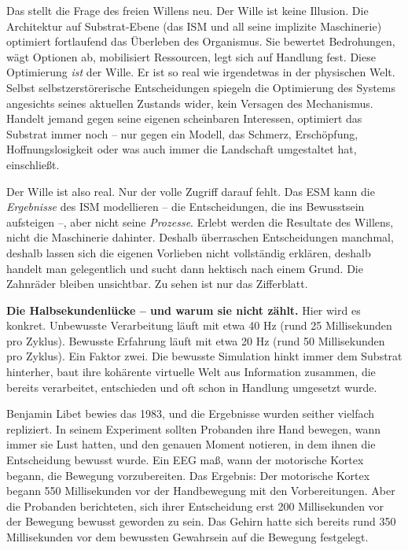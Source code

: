 \documentclass[11pt, twoside, openright]{book}
\begin{document}
Das stellt die Frage des freien Willens neu. Der Wille ist keine Illusion. Die Architektur auf Substrat-Ebene (das ISM und all seine implizite Maschinerie) optimiert fortlaufend das Überleben des Organismus. Sie bewertet Bedrohungen, wägt Optionen ab, mobilisiert Ressourcen, legt sich auf Handlung fest. Diese Optimierung \textit{ist} der Wille. Er ist so real wie irgendetwas in der physischen Welt. Selbst selbstzerstörerische Entscheidungen spiegeln die Optimierung des Systems angesichts seines aktuellen Zustands wider, kein Versagen des Mechanismus. Handelt jemand gegen seine eigenen scheinbaren Interessen, optimiert das Substrat immer noch -- nur gegen ein Modell, das Schmerz, Erschöpfung, Hoffnungslosigkeit oder was auch immer die Landschaft umgestaltet hat, einschließt.

Der Wille ist also real. Nur der volle Zugriff darauf fehlt. Das ESM kann die \textit{Ergebnisse} des ISM modellieren -- die Entscheidungen, die ins Bewusstsein aufsteigen --, aber nicht seine \textit{Prozesse}. Erlebt werden die Resultate des Willens, nicht die Maschinerie dahinter. Deshalb überraschen Entscheidungen manchmal, deshalb lassen sich die eigenen Vorlieben nicht vollständig erklären, deshalb handelt man gelegentlich und sucht dann hektisch nach einem Grund. Die Zahnräder bleiben unsichtbar. Zu sehen ist nur das Zifferblatt.

\textbf{Die Halbsekundenlücke -- und warum sie nicht zählt.} Hier wird es konkret. Unbewusste Verarbeitung läuft mit etwa 40 Hz (rund 25 Millisekunden pro Zyklus). Bewusste Erfahrung läuft mit etwa 20 Hz (rund 50 Millisekunden pro Zyklus). Ein Faktor zwei. Die bewusste Simulation hinkt immer dem Substrat hinterher, baut ihre kohärente virtuelle Welt aus Information zusammen, die bereits verarbeitet, entschieden und oft schon in Handlung umgesetzt wurde.

Benjamin Libet bewies das 1983, und die Ergebnisse wurden seither vielfach repliziert. In seinem Experiment sollten Probanden ihre Hand bewegen, wann immer sie Lust hatten, und den genauen Moment notieren, in dem ihnen die Entscheidung bewusst wurde. Ein EEG maß, wann der motorische Kortex begann, die Bewegung vorzubereiten. Das Ergebnis: Der motorische Kortex begann 550 Millisekunden vor der Handbewegung mit den Vorbereitungen. Aber die Probanden berichteten, sich ihrer Entscheidung erst 200 Millisekunden vor der Bewegung bewusst geworden zu sein. Das Gehirn hatte sich bereits rund 350 Millisekunden vor dem bewussten Gewahrsein auf die Bewegung festgelegt.
\end{document}
